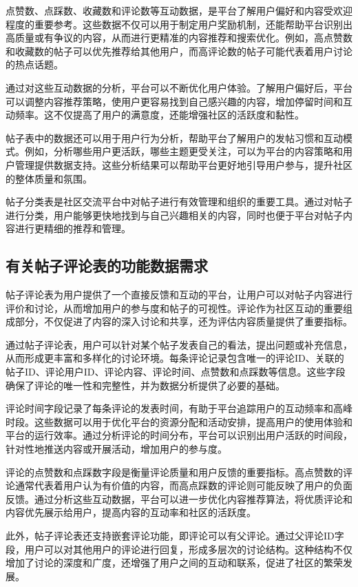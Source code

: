 点赞数、点踩数、收藏数和评论数等互动数据，是平台了解用户偏好和内容受欢迎程度的重要参考。这些数据不仅可以用于制定用户奖励机制，还能帮助平台识别出高质量或有争议的内容，从而进行更精准的内容推荐和搜索优化。例如，高点赞数和收藏数的帖子可以优先推荐给其他用户，而高评论数的帖子可能代表着用户讨论的热点话题。

通过对这些互动数据的分析，平台可以不断优化用户体验。了解用户偏好后，平台可以调整内容推荐策略，使用户更容易找到自己感兴趣的内容，增加停留时间和互动频率。这不仅提高了用户的满意度，还能增强社区的活跃度和黏性。

帖子表中的数据还可以用于用户行为分析，帮助平台了解用户的发帖习惯和互动模式。例如，分析哪些用户更活跃，哪些主题更受关注，可以为平台的内容策略和用户管理提供数据支持。这些分析结果可以帮助平台更好地引导用户参与，提升社区的整体质量和氛围。

帖子分类表是社区交流平台中对帖子进行有效管理和组织的重要工具。通过对帖子进行分类，用户能够更快地找到与自己兴趣相关的内容，同时也便于平台对帖子内容进行更精细的推荐和管理。

\subsection{有关帖子评论表的功能数据需求}

帖子评论表为用户提供了一个直接反馈和互动的平台，让用户可以对帖子内容进行评价和讨论，从而增加用户的参与度和帖子的可视性。评论作为社区互动的重要组成部分，不仅促进了内容的深入讨论和共享，还为评估内容质量提供了重要指标。

通过帖子评论表，用户可以针对某个帖子发表自己的看法，提出问题或补充信息，从而形成更丰富和多样化的讨论环境。每条评论记录包含唯一的评论ID、关联的帖子ID、评论用户ID、评论内容、评论时间、点赞数和点踩数等信息。这些字段确保了评论的唯一性和完整性，并为数据分析提供了必要的基础。

评论时间字段记录了每条评论的发表时间，有助于平台追踪用户的互动频率和高峰时段。这些数据可以用于优化平台的资源分配和活动安排，提高用户的使用体验和平台的运行效率。通过分析评论的时间分布，平台可以识别出用户活跃的时间段，针对性地推送内容或开展活动，增加用户的参与度。

评论的点赞数和点踩数字段是衡量评论质量和用户反馈的重要指标。高点赞数的评论通常代表着用户认为有价值的内容，而高点踩数的评论则可能反映了用户的负面反馈。通过分析这些互动数据，平台可以进一步优化内容推荐算法，将优质评论和内容优先展示给用户，提高内容的互动率和社区的活跃度。

此外，帖子评论表还支持嵌套评论功能，即评论可以有父评论。通过父评论ID字段，用户可以对其他用户的评论进行回复，形成多层次的讨论结构。这种结构不仅增加了讨论的深度和广度，还增强了用户之间的互动和联系，促进了社区的繁荣发展。

